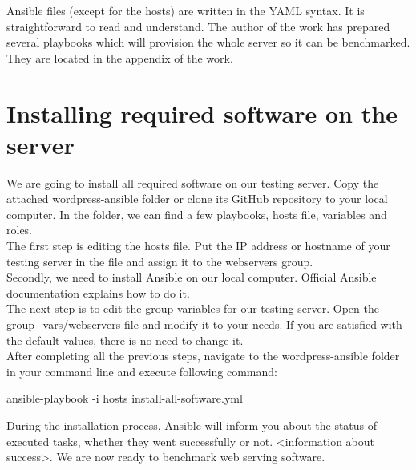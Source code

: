 Ansible files (except for the hosts) are written in the YAML syntax. It is straightforward to read and understand. The author of the work has prepared several playbooks which will provision the whole server so it can be benchmarked. They are located in the appendix of the work.

\section{Installing required software on the server}

We are going to install all required software on our testing server. Copy the attached wordpress-ansible folder or clone its GitHub repository to your local computer. In the folder, we can find a few playbooks, hosts file, variables and roles. \\

The first step is editing the hosts file. Put the IP address or hostname of your testing server in the file and assign it to the webservers group. \\

Secondly, we need to install Ansible on our local computer. Official Ansible documentation \cite{Ansible:install} explains how to do it. \\

The next step is to edit the group variables for our testing server. Open the group\_vars/webservers file and modify it to your needs. If you are satisfied with the default values, there is no need to change it. \\

After completing all the previous steps, navigate to the wordpress-ansible folder in your command line and execute following command:

ansible-playbook -i hosts install-all-software.yml

During the installation process, Ansible will inform you about the status of executed tasks, whether they went successfully or not. <information about success>. We are now ready to benchmark web serving software.

